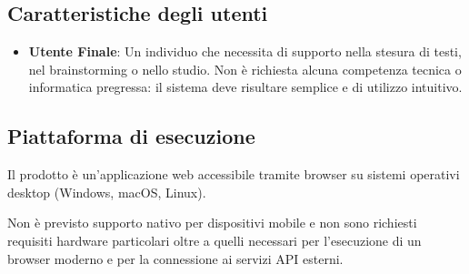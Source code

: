 \subsection{Caratteristiche degli utenti}
\begin{itemize}
	\item \textbf{Utente Finale}: Un individuo che necessita di supporto nella stesura di testi, nel brainstorming o nello studio. Non è richiesta alcuna competenza tecnica o informatica pregressa: il sistema deve risultare semplice e di utilizzo intuitivo.
\end{itemize}

\subsection{Piattaforma di esecuzione}
Il prodotto è un'applicazione web accessibile tramite browser su sistemi operativi desktop (Windows, macOS, Linux). 

Non è previsto supporto nativo per dispositivi mobile e non sono richiesti requisiti hardware particolari oltre a quelli necessari per l'esecuzione di un browser moderno e per la connessione ai servizi API esterni.

